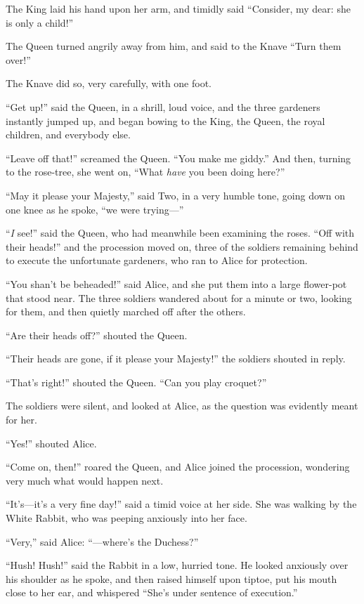 \documentclass[book, 20pt]{extbook}
\begin{document}
The King laid his hand upon her arm, and timidly said ``Consider, my
dear: she is only a child!''

The Queen turned angrily away from him, and said to the Knave ``Turn
them over!''

The Knave did so, very carefully, with one foot.

``Get up!'' said the Queen, in a shrill, loud voice, and the three
gardeners instantly jumped up, and began bowing to the King, the Queen,
the royal children, and everybody else.

``Leave off that!'' screamed the Queen. ``You make me giddy.'' And then,
turning to the rose-tree, she went on, ``What \emph{have} you been doing
here?''

``May it please your Majesty,'' said Two, in a very humble tone, going
down on one knee as he spoke, ``we were trying---''

``\emph{I} see!'' said the Queen, who had meanwhile been examining the
roses. ``Off with their heads!'' and the procession moved on, three of
the soldiers remaining behind to execute the unfortunate gardeners, who
ran to Alice for protection.

``You shan't be beheaded!'' said Alice, and she put them into a large
flower-pot that stood near. The three soldiers wandered about for a
minute or two, looking for them, and then quietly marched off after the
others.

``Are their heads off?'' shouted the Queen.

``Their heads are gone, if it please your Majesty!'' the soldiers
shouted in reply.

``That's right!'' shouted the Queen. ``Can you play croquet?''

The soldiers were silent, and looked at Alice, as the question was
evidently meant for her.

``Yes!'' shouted Alice.

``Come on, then!'' roared the Queen, and Alice joined the procession,
wondering very much what would happen next.

``It's---it's a very fine day!'' said a timid voice at her side. She was
walking by the White Rabbit, who was peeping anxiously into her face.

``Very,'' said Alice: ``---where's the Duchess?''

``Hush! Hush!'' said the Rabbit in a low, hurried tone. He looked
anxiously over his shoulder as he spoke, and then raised himself upon
tiptoe, put his mouth close to her ear, and whispered ``She's under
sentence of execution.''
\end{document}
